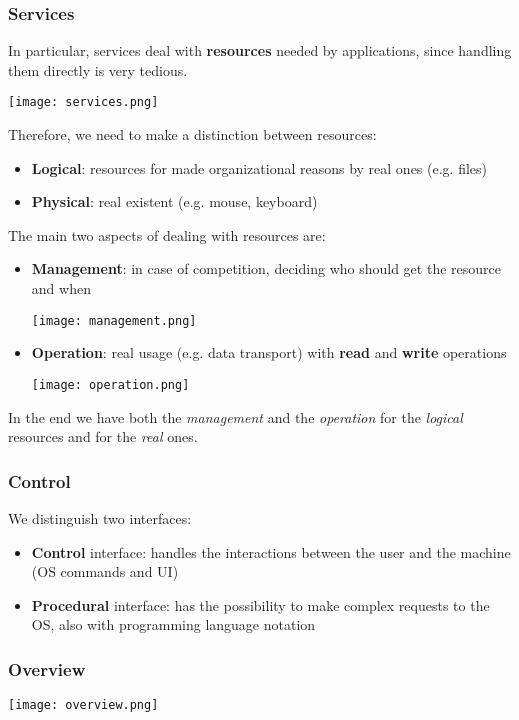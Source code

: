 \subsubsection{Services}
In particular, services deal with \textbf{resources} needed by applications, since handling them directly is very tedious.
\begin{center}
	\texttt{[image: services.png]}
\end{center}
Therefore, we need to make a distinction between resources:
\begin{itemize}
	\item \textbf{Logical}: resources for made organizational reasons  by real ones (e.g. files)
	\item \textbf{Physical}: real existent (e.g. mouse, keyboard)
\end{itemize}
The main two aspects of dealing with resources are:
\begin{itemize}
	\item \textbf{Management}: in case of competition, deciding who should get the resource and when
	\begin{center}
		\texttt{[image: management.png]}
	\end{center}
	\item \textbf{Operation}: real usage (e.g. data transport) with \textbf{read} and \textbf{write} operations
	\begin{center}
		\texttt{[image: operation.png]}
	\end{center}
\end{itemize}
In the end we have both the \textit{management} and the \textit{operation} for the \textit{logical} resources and for the \textit{real} ones.

\subsubsection{Control}
We distinguish two interfaces:
\begin{itemize}
	\item \textbf{Control} interface: handles the interactions between the user and the machine (OS commands and UI)
	\item \textbf{Procedural} interface: has the possibility to make complex requests to the OS, also with programming language notation
\end{itemize}

\subsubsection{Overview}
\begin{center}
	\texttt{[image: overview.png]}
\end{center}

